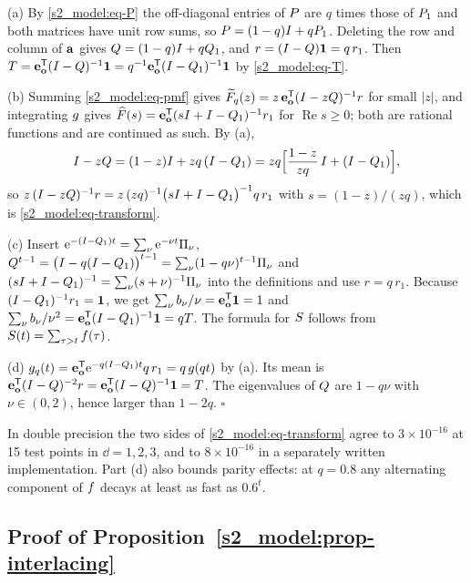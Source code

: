 (a) By \eqref{s2_model:eq-P} the off-diagonal entries of $P$ are $q$ times those of $P_1$ and both matrices have
unit row sums, so $P=(1-q)I+qP_1$. Deleting the row and column of $\mathbf{a}$ gives $Q=(1-q)I+qQ_1$, and
$r=(I-Q)\mathbf{1}=q\,r_1$. Then $T=\mathbf{e}_{\mathbf{o}}^{\mathsf{T}}(I-Q)^{-1}\mathbf{1}=q^{-1}\mathbf{e}_{\mathbf{o}}^{\mathsf{T}}(I-Q_1)^{-1}\mathbf{1}$ by
\eqref{s2_model:eq-T}.

(b) Summing \eqref{s2_model:eq-pmf} gives $\widetilde{F}_q(z)=z\,\mathbf{e}_{\mathbf{o}}^{\mathsf{T}}(I-zQ)^{-1}r$ for small $|z|$, and integrating
$g$ gives $\widehat{F}(s)=\mathbf{e}_{\mathbf{o}}^{\mathsf{T}}(sI+I-Q_1)^{-1}r_1$ for $\operatorname{Re}s\ge0$; both are rational functions and
are continued as such. By (a),
\[
  I-zQ=(1-z)I+zq\,(I-Q_1)=zq\Bigl[\frac{1-z}{zq}\,I+(I-Q_1)\Bigr],
\]
so $z\,(I-zQ)^{-1}r=z\,(zq)^{-1}\bigl(sI+I-Q_1\bigr)^{-1}q\,r_1$ with $s=(1-z)/(zq)$, which is
\eqref{s2_model:eq-transform}.

(c) Insert $\mathrm{e}^{-(I-Q_1)t}=\sum_\nu\mathrm{e}^{-\nu t}\Pi_\nu$,
$Q^{t-1}=\bigl(I-q(I-Q_1)\bigr)^{t-1}=\sum_\nu(1-q\nu)^{t-1}\Pi_\nu$ and
$(sI+I-Q_1)^{-1}=\sum_\nu(s+\nu)^{-1}\Pi_\nu$ into the definitions and use $r=q\,r_1$. Because
$(I-Q_1)^{-1}r_1=\mathbf{1}$, we get $\sum_\nu b_\nu/\nu=\mathbf{e}_{\mathbf{o}}^{\mathsf{T}}\mathbf{1}=1$ and
$\sum_\nu b_\nu/\nu^{2}=\mathbf{e}_{\mathbf{o}}^{\mathsf{T}}(I-Q_1)^{-1}\mathbf{1}=qT$. The formula for $S$ follows from
$S(t)=\sum_{\tau>t}f(\tau)$.

(d) $g_q(t)=\mathbf{e}_{\mathbf{o}}^{\mathsf{T}}\mathrm{e}^{-q(I-Q_1)t}q\,r_1=q\,g(qt)$ by (a). Its mean is
$\mathbf{e}_{\mathbf{o}}^{\mathsf{T}}(I-Q)^{-2}r=\mathbf{e}_{\mathbf{o}}^{\mathsf{T}}(I-Q)^{-1}\mathbf{1}=T$. The eigenvalues of $Q$ are $1-q\nu$ with
$\nu\in(0,2)$, hence larger than $1-2q$. \hfill$\square$

In double precision the two sides of \eqref{s2_model:eq-transform} agree to $3\times10^{-16}$ at 15 test points in
$\dd=1,2,3$, and to $8\times10^{-16}$ in a separately written implementation.
Part (d) also bounds parity effects: at $q=0.8$ any alternating component of $f$ decays at least as fast as
$0.6^{t}$.

\subsection{Proof of Proposition~\ref{s2_model:prop-interlacing}}

